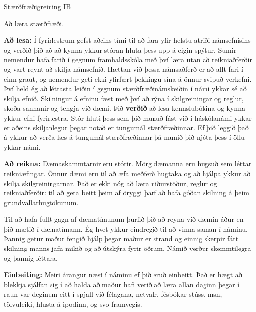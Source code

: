 \documentclass[12pt]{article}
\begin{document}
\pagestyle{empty}

\newcommand{\dive}{\mbox{${\rm div}$}}
\newcommand{\rot}{\mbox{${\rm rot}$}}
\newcommand{\R}{\mbox{${\bf R}$}}
\newcommand{\Ov}{\mbox{${\bf 0}$}}
\newcommand{\rv}{\mbox{${\bf r}$}}
\newcommand{\vv}{\mbox{${\bf v}$}}
\newcommand{\av}{\mbox{${\bf a}$}}
\newcommand{\bv}{\mbox{${\bf b}$}}
\newcommand{\cv}{\mbox{${\bf c}$}}
\newcommand{\iv}{\mbox{${\bf i}$}}
\newcommand{\jv}{\mbox{${\bf j}$}}
\newcommand{\kv}{\mbox{${\bf k}$}}
\newcommand{\Rn}{\mbox{${\bf R}^n$}}
\newcommand{\Rm}{\mbox{${\bf R}^m$}}

\centerline{\sc \LARGE Stærðfræðigreining IB}
\medskip
\centerline{\sc \large Að læra stærðfræði.}
\bigskip
\medskip


{\bf Að lesa:}    
Í fyrirlestrum gefst aðeins 
tími til að fara yfir helstu atriði námsefnisins og verðið þið að
að kynna ykkur stóran hluta þess upp á eigin spýtur. Sumir nemendur
hafa farið í gegnum framhaldsskóla með því
læra utan að reikniaðferðir og vart reynt að skilja námsefnið.  Hættan
við þessa námsaðferð er að allt fari
í einn graut, og 
nemendur geti ekki yfirfært þekkingu sína á önnur svipuð verkefni.
Því held ég að léttasta leiðin í gegnum stærðfræðinámskeiðin í námi
ykkar sé að skilja efnið.  Skilningur á efninu fæst með því að rýna í
skilgreiningar og reglur, skoða sannanir og tengja við dæmi.  
Þið {\bf verðið} að lesa
kennslubókina og kynna ykkur efni fyrirlestra.  
Stór hluti þess sem þið munuð fást við í
háskólanámi ykkar er aðeins skiljanlegur þegar notað er tungumál
stærðfræðinnar.  Ef þið leggið það á ykkur að verða læs á tungumál
stærðfræðinnar þá munið þið njóta þess í öllu ykkar námi.

{\bf Að reikna:}  
Dæmaskammtarnir eru stórir.  Mörg dæmanna eru hugsuð 
sem léttar reikniæfingar.
Önnur dæmi eru til að æfa  
meðferð hugtaka og að hjálpa ykkur að skilja 
skilgreiningarnar.  Það er ekki nóg að læra niðurstöður, reglur og 
reikniaðferðir: til að geta beitt þeim af öryggi þarf að hafa góðan 
skilning á þeim grundvallarhugtökunum.
 
Til að hafa fullt gagn af dæmatímunum þurfið þið að reyna við dæmin
áður en þið mætið í dæmatímann.
Ég hvet ykkur eindregið til að vinna saman í náminu.  Þannig getur
maður fengið hjálp þegar maður er strand og
einnig skerpir fátt skilning manns  jafn mikið og að útskýra
fyrir öðrum.  Námið verður  skemmtilegra og þannig
léttara.  

{\bf Einbeiting:}  Meiri árangur næst í náminu ef þið eruð einbeitt.
Það er hægt að blekkja sjálfan sig í að halda að maður hafi verið að
læra allan daginn þegar í raun var deginum eitt í spjall við félagana,
netvafr, fésbókar stúss, msn, tölvuleiki, hlusta á ipodinn, og
svo framvegis.   
\end{document}
